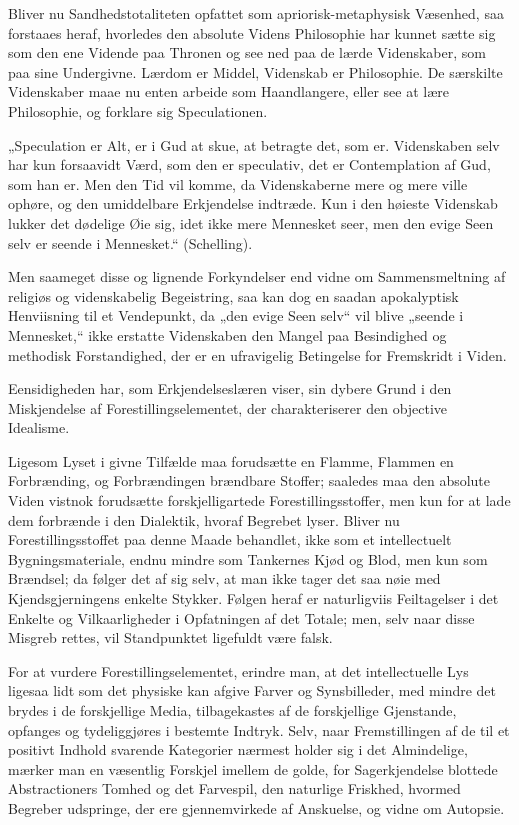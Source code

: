 \documentclass[12pt]{book}
\newcommand{\opage}[1]{\marginnote{\footnotesize\textit{[#1]}}}
\begin{document}
Bliver nu Sandhedstotaliteten opfattet som apriorisk-metaphysisk Væsenhed, saa forstaaes
heraf, hvorledes den
\opage{82} absolute Videns Philosophie har kunnet sætte sig som den ene Vidende paa Thronen og see
ned paa de lærde Videnskaber, som paa sine Undergivne. Lærdom er Middel, Videnskab er
Philosophie. De særskilte Videnskaber maae nu enten arbeide som Haandlangere, eller see
at lære Philosophie, og forklare sig Speculationen.

„Speculation er Alt, er i Gud at skue, at betragte det, som er. Videnskaben selv har
kun forsaavidt Værd, som den er speculativ, det er Contemplation af Gud, som han er.
Men den Tid vil komme, da Videnskaberne mere og mere ville ophøre, og den umiddelbare
Erkjendelse indtræde. Kun i den høieste Videnskab lukker det dødelige Øie sig, idet ikke
mere Mennesket seer, men den evige Seen selv er seende i Mennesket.“ (Schelling).

Men saameget disse og lignende Forkyndelser end vidne om Sammensmeltning af religiøs og
videnskabelig Begeistring, saa kan dog en saadan apokalyptisk Henviisning til et
Vendepunkt, da „den evige Seen selv“ vil blive „seende i Mennesket,“ ikke erstatte
Videnskaben den Mangel paa Besindighed og methodisk Forstandighed, der er en
ufravigelig Betingelse for Fremskridt i Viden.

Eensidigheden har, som Erkjendelseslæren viser, sin dybere Grund i den Miskjendelse af
Forestillingselementet, der charakteriserer den objective Idealisme.

Ligesom Lyset i givne Tilfælde maa forudsætte en Flamme, Flammen en Forbrænding, og
Forbrændingen brændbare Stoffer; saaledes maa den absolute Viden vistnok forudsætte
forskjelligartede Forestillingsstoffer, men kun for at lade dem forbrænde i den
Dialektik, hvoraf Begrebet lyser. Bliver nu Forestillingsstoffet paa denne Maade
behandlet, ikke som et intellectuelt Bygningsmateriale, endnu mindre som Tankernes Kjød
og Blod, men kun som Brændsel; da følger det af sig selv, at man ikke tager det saa nøie
med Kjendsgjerningens enkelte Stykker.
\opage{83} Følgen heraf er naturligviis Feiltagelser i det Enkelte og Vilkaarligheder i
Opfatningen af det Totale; men, selv naar disse Misgreb rettes, vil Standpunktet
ligefuldt være falsk.

For at vurdere Forestillingselementet, erindre man, at det intellectuelle Lys ligesaa
lidt som det physiske kan afgive Farver og Synsbilleder, med mindre det brydes i de
forskjellige Media, tilbagekastes af de forskjellige Gjenstande, opfanges og
tydeliggjøres i bestemte Indtryk. Selv, naar Fremstillingen af de til et positivt
Indhold svarende Kategorier nærmest holder sig i det Almindelige, mærker man en
væsentlig Forskjel imellem de golde, for Sagerkjendelse blottede Abstractioners Tomhed
og det Farvespil, den naturlige Friskhed, hvormed Begreber udspringe, der ere
gjennemvirkede af Anskuelse, og vidne om Autopsie.
\end{document}
